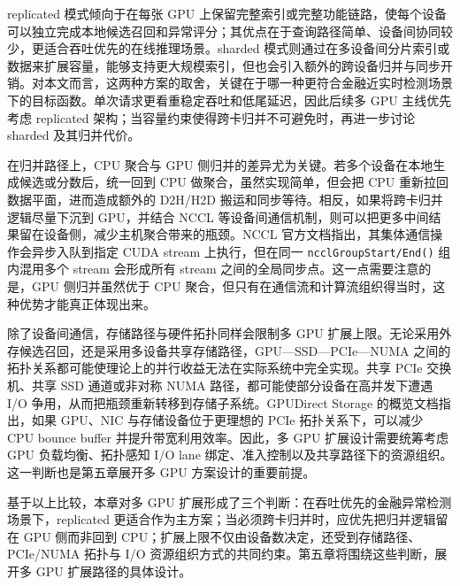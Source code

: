 replicated 模式倾向于在每张 GPU 上保留完整索引或完整功能链路，使每个设备可以独立完成本地候选召回和异常评分；其优点在于查询路径简单、设备间协同较少，更适合吞吐优先的在线推理场景。sharded 模式则通过在多设备间分片索引或数据来扩展容量，能够支持更大规模索引，但也会引入额外的跨设备归并与同步开销。对本文而言，这两种方案的取舍，关键在于哪一种更符合金融近实时检测场景下的目标函数。单次请求更看重稳定吞吐和低尾延迟，因此后续多 GPU 主线优先考虑 replicated 架构；当容量约束使得跨卡归并不可避免时，再进一步讨论 sharded 及其归并代价\citep{cuvs_multi_gpu_nn}。

在归并路径上，CPU 聚合与 GPU 侧归并的差异尤为关键。若多个设备在本地生成候选或分数后，统一回到 CPU 做聚合，虽然实现简单，但会把 CPU 重新拉回数据平面，进而造成额外的 D2H/H2D 搬运和同步等待。相反，如果将跨卡归并逻辑尽量下沉到 GPU，并结合 NCCL 等设备间通信机制，则可以把更多中间结果留在设备侧，减少主机聚合带来的瓶颈。NCCL 官方文档指出，其集体通信操作会异步入队到指定 CUDA stream 上执行，但在同一 \texttt{ncclGroupStart/End()} 组内混用多个 stream 会形成所有 stream 之间的全局同步点\citep{nccl_stream_semantics}。这一点需要注意的是，GPU 侧归并虽然优于 CPU 聚合，但只有在通信流和计算流组织得当时，这种优势才能真正体现出来。

除了设备间通信，存储路径与硬件拓扑同样会限制多 GPU 扩展上限。无论采用外存候选召回，还是采用多设备共享存储路径，GPU---SSD---PCIe---NUMA 之间的拓扑关系都可能使理论上的并行收益无法在实际系统中完全实现。共享 PCIe 交换机、共享 SSD 通道或非对称 NUMA 路径，都可能使部分设备在高并发下遭遇 I/O 争用，从而把瓶颈重新转移到存储子系统。GPUDirect Storage 的概览文档指出，如果 GPU、NIC 与存储设备位于更理想的 PCIe 拓扑关系下，可以减少 CPU bounce buffer 并提升带宽利用效率\citep{gds_overview,gds_design_guide}。因此，多 GPU 扩展设计需要统筹考虑 GPU 负载均衡、拓扑感知 I/O lane 绑定、准入控制以及共享路径下的资源组织。这一判断也是第五章展开多 GPU 方案设计的重要前提。

基于以上比较，本章对多 GPU 扩展形成了三个判断：在吞吐优先的金融异常检测场景下，replicated 更适合作为主方案；当必须跨卡归并时，应优先把归并逻辑留在 GPU 侧而非回到 CPU；扩展上限不仅由设备数决定，还受到存储路径、PCIe/NUMA 拓扑与 I/O 资源组织方式的共同约束。第五章将围绕这些判断，展开多 GPU 扩展路径的具体设计。

